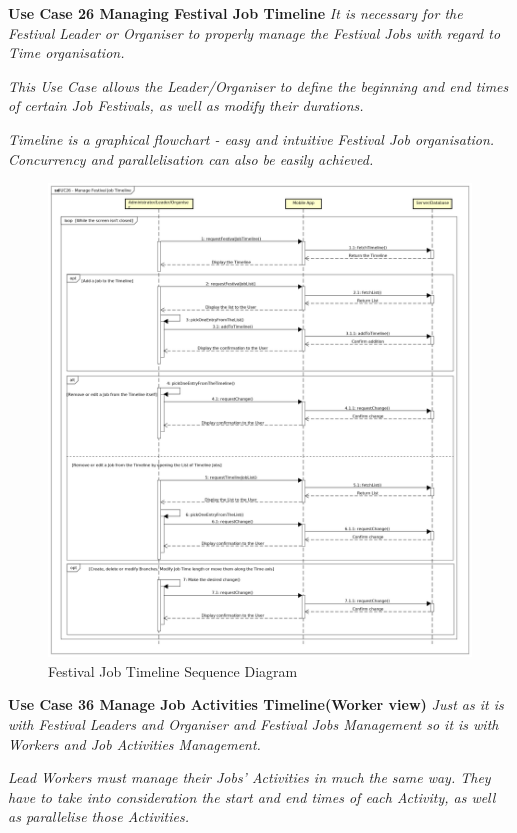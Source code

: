 				\textbf{Use Case 26 Managing Festival Job Timeline}
				\textit{It is necessary for the Festival Leader or Organiser to properly manage the Festival Jobs with regard to Time organisation.}
				
				\textit{This Use Case allows the Leader/Organiser to define the beginning and end times of certain Job Festivals, as well as modify their durations.}
			
				\textit{Timeline is a graphical flowchart - easy and intuitive Festival Job organisation. Concurrency and parallelisation can also be easily achieved.}
				
				\begin{figure}[H]
					\includegraphics[width=\linewidth]{diagrams/sd-diag1-fjt.png}
					\caption{Festival Job Timeline Sequence Diagram}
					\label{fig:sd1_festival_job_timeline}
				\end{figure}
				
				\textbf{Use Case 36 Manage Job Activities Timeline(Worker view)}
				\textit{Just as it is with Festival Leaders and Organiser and Festival Jobs Management so it is with Workers and Job Activities Management.}
				
				\textit{Lead Workers must manage their Jobs' Activities in much the same way. They have to take into consideration the start and end times of each Activity, as well as parallelise those Activities.}
			
